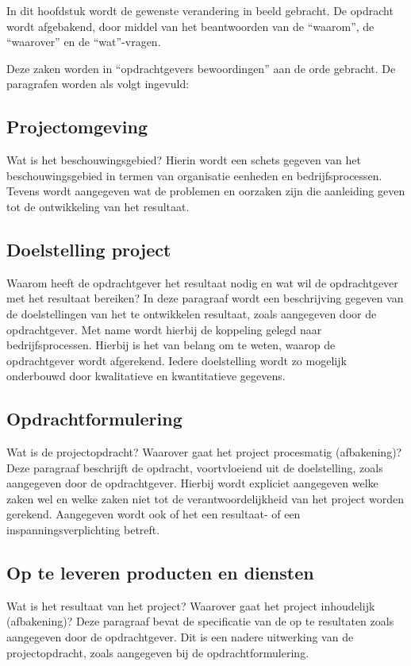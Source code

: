 \documentclass{article}
\begin{document}
In dit hoofdstuk wordt de gewenste verandering in beeld gebracht.
De opdracht wordt afgebakend, door middel van het beantwoorden van de ``waarom'', de ``waarover'' en de ``wat''-vragen.

Deze zaken worden in ``opdrachtgevers bewoordingen'' aan de orde gebracht.
De paragrafen worden als volgt ingevuld:

\subsection{Projectomgeving}
Wat is het beschouwingsgebied?
Hierin wordt een schets gegeven van het beschouwingsgebied in termen van organisatie eenheden en bedrijfsprocessen.
Tevens wordt aangegeven wat de problemen en oorzaken zijn die aanleiding geven tot de ontwikkeling van het resultaat.


\subsection{Doelstelling project}
Waarom heeft de opdrachtgever het resultaat nodig en wat wil de opdrachtgever met het resultaat bereiken?
In deze paragraaf wordt een beschrijving gegeven van de doelstellingen van het te ontwikkelen resultaat,
zoals aangegeven door de opdrachtgever.
Met name wordt hierbij de koppeling gelegd naar bedrijfsprocessen.
Hierbij is het van belang om te weten, waarop de opdrachtgever wordt afgerekend.
Iedere doelstelling wordt zo mogelijk onderbouwd door kwalitatieve en kwantitatieve gegevens.

\subsection{Opdrachtformulering}
Wat is de projectopdracht?
Waarover gaat het project procesmatig (afbakening)?
Deze paragraaf beschrijft de opdracht, voortvloeiend uit de doelstelling, zoals aangegeven door de opdrachtgever.
Hierbij wordt expliciet aangegeven welke zaken wel en welke zaken niet tot de verantwoordelijkheid van het project worden gerekend.
Aangegeven wordt ook of het een resultaat- of een inspanningsverplichting betreft.

\subsection{Op te leveren producten en diensten}
Wat is het resultaat van het project?
Waarover gaat het project inhoudelijk (afbakening)?
Deze paragraaf bevat de specificatie van de op te resultaten zoals aangegeven door de opdrachtgever.
Dit is een nadere uitwerking van de projectopdracht, zoals aangegeven bij de opdrachtformulering.
\end{document}
